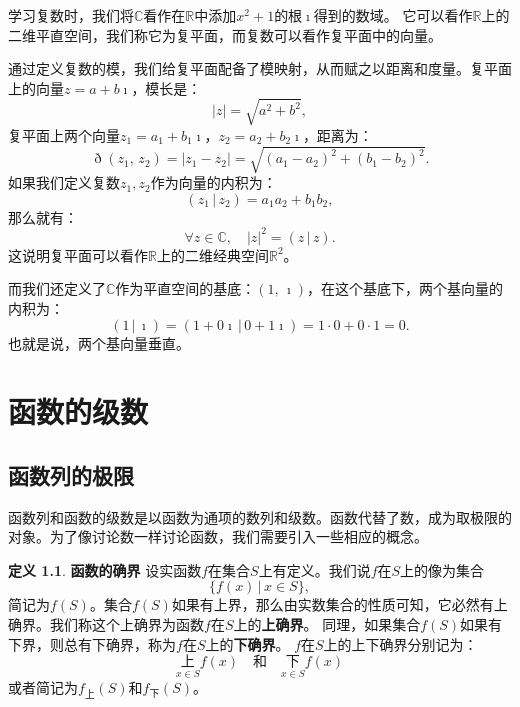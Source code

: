 \documentclass[12pt,UTF8]{ctexbook}
\newcommand{\nji}[2]{\displaystyle\left( #1 \,|\, #2\right)}
\theoremstyle{definition}
\newtheorem{df}{定义}[section]
\theoremstyle{plain}
\begin{document}
\begin{appendix}
学习复数时，我们将$\mathbb{C}$看作在$\mathbb{R}$中添加$x^2 + 1$的根$\imath$得到的数域。
它可以看作$\mathbb{R}$上的二维平直空间，我们称它为复平面，而复数可以看作复平面中的向量。

通过定义复数的模，我们给复平面配备了模映射，从而赋之以距离和度量。复平面上的向量$z = a + b\imath$，模长是：
$$ |z| = \sqrt{a^2 + b^2},$$
复平面上两个向量$z_1 = a_1 + b_1\imath$，$z_2 = a_2 + b_2\imath$，距离为：
$$ \eth(z_1,\, z_2) = |z_1 - z_2| = \sqrt{(a_1 - a_2)^2 + (b_1 - b_2)^2}. $$
如果我们定义复数$z_1, z_2$作为向量的内积为：
$$ \nji{z_1}{z_2} = a_1a_2 + b_1b_2,$$
那么就有：
$$ \forall z \in \mathbb{C}, \quad |z|^2 = \nji{z}{z}. $$
这说明复平面可以看作$\mathbb{R}$上的二维经典空间$\mathbb{R}^2$。

而我们还定义了$\mathbb{C}$作为平直空间的基底：$(1,\, \imath)$，在这个基底下，两个基向量的内积为：
$$ \nji{1}{\imath} = \nji{1 + 0\imath}{0 + 1\imath} = 1\cdot 0 + 0\cdot 1 = 0.$$
也就是说，两个基向量垂直。

\chapter{函数的级数}

\section{函数列的极限}

函数列和函数的级数是以函数为通项的数列和级数。函数代替了数，成为取极限的对象。为了像讨论数一样讨论函数，我们需要引入一些相应的概念。

\begin{df}{\textbf{函数的确界}}
    设实函数$f$在集合$S$上有定义。我们说$f$在$S$上的像为集合
    $$ \{f(x) \,|\, x\in S\}, $$
    简记为$f(S)$。集合$f(S)$如果有上界，那么由实数集合的性质可知，它必然有上确界。我们称这个上确界为函数$f$在$S$上的\textbf{上确界}。
    同理，如果集合$f(S)$如果有下界，则总有下确界，称为$f$在$S$上的\textbf{下确界}。
    $f$在$S$上的上下确界分别记为：
    $$ \underset{x\in S}{\text{上}} f(x) \quad \mbox{和} \quad \underset{x\in S}{\text{下}} f(x)$$
    或者简记为$f_{\text{上}}(S)$和$f_{\text{下}}(S)$。
\end{df}


\end{appendix}
\end{document}
